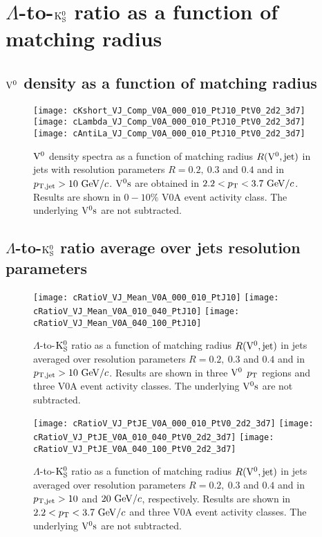 \documentclass[12pt]{article}
\begin{document}
\newpage
\section{$\Lambda$-to-${\rm K}_{\rm S}^{0}$ ratio as a function of matching radius}

\subsection{${\rm V}^{0}$ density as a function of matching radius}

\begin{figure}[htbp]
\centering
\texttt{[image: cKshort\_VJ\_Comp\_V0A\_000\_010\_PtJ10\_PtV0\_2d2\_3d7]}
\texttt{[image: cLambda\_VJ\_Comp\_V0A\_000\_010\_PtJ10\_PtV0\_2d2\_3d7]}
\texttt{[image: cAntiLa\_VJ\_Comp\_V0A\_000\_010\_PtJ10\_PtV0\_2d2\_3d7]}
\caption{${\rm V}^{0}$ density spectra as a function of matching radius $R({\rm V}^{0},{\rm jet})$ in jets
  with resolution parameters $R=0.2,~0.3$ and $0.4$ and in $p_{\rm T,jet}>10~{\rm GeV}/c$.
  ${\rm V}^{0}{\rm s}$ are obtained in $2.2<p_{\rm T}<3.7~{\rm GeV}/c$.
  Results are shown in $0-10\%$ V0A event activity class.
  The underlying ${\rm V}^{0}{\rm s}$ are not subtracted.}
\label{fig:s02SpcVJV0APtj10}
\end{figure}

\newpage
\subsection{$\Lambda$-to-${\rm K}_{\rm S}^{0}$ ratio average over jets resolution parameters}

\begin{figure}[htbp]
\centering
\texttt{[image: cRatioV\_VJ\_Mean\_V0A\_000\_010\_PtJ10]}
\texttt{[image: cRatioV\_VJ\_Mean\_V0A\_010\_040\_PtJ10]}
\texttt{[image: cRatioV\_VJ\_Mean\_V0A\_040\_100\_PtJ10]}
\caption{$\Lambda$-to-${\rm K}_{\rm S}^{0}$ ratio as a function of matching radius $R({\rm V}^{0},{\rm jet})$ in jets
 averaged over resolution parameters $R=0.2,~0.3$ and $0.4$ and in $p_{\rm T,jet}>10~{\rm GeV}/c$.
 Results are shown in three ${\rm V}^{0}$ $p_{\rm T}$ regions and
 three V0A event activity classes.
 The underlying ${\rm V}^{0}{\rm s}$ are not subtracted.}
\label{fig:s02L2KVJV0APtj10}
\end{figure}

\begin{figure}[htbp]
\centering
\texttt{[image: cRatioV\_VJ\_PtJE\_V0A\_000\_010\_PtV0\_2d2\_3d7]}
\texttt{[image: cRatioV\_VJ\_PtJE\_V0A\_010\_040\_PtV0\_2d2\_3d7]}
\texttt{[image: cRatioV\_VJ\_PtJE\_V0A\_040\_100\_PtV0\_2d2\_3d7]}
\caption{$\Lambda$-to-${\rm K}_{\rm S}^{0}$ ratio as a function of matching radius $R({\rm V}^{0},{\rm jet})$ in jets
 averaged over resolution parameters $R=0.2,~0.3$ and $0.4$ and in $p_{\rm T,jet}>10$
 and $20~{\rm GeV}/c$, respectively.
 Results are shown in $2.2<p_{\rm T}<3.7~{\rm GeV}/c$ and
 three V0A event activity classes.
 The underlying ${\rm V}^{0}{\rm s}$ are not subtracted.}
\label{fig:s02L2KVJV0APtjXX}
\end{figure}
\end{document}
